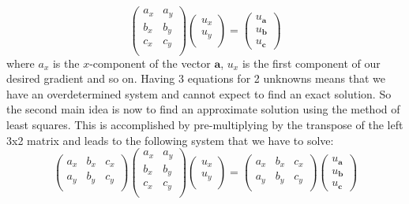 \begin{equation}
\begin{pmatrix}
  a_x & a_y  \\
  b_x & b_y  \\
  c_x & c_y  \\
\end{pmatrix}
\begin{pmatrix}
  u_x  \\
  u_y  \\
\end{pmatrix}
=
\begin{pmatrix}
  u_{\mathbf{a}}  \\
  u_{\mathbf{b}}  \\
  u_{\mathbf{c}}
\end{pmatrix}
\end{equation}
where $a_x$ is the $x$-component of the vector $\mathbf{a}$, $u_x$ is the first component of our desired gradient and so on. Having 3 equations for 2 unknowns means that we have an overdetermined system and cannot expect to find an exact solution. So the second main idea is now to find an approximate solution using the method of least squares. This is accomplished by pre-multiplying by the transpose of the left 3x2 matrix and leads to the following system that we have to solve:
\begin{equation}
\begin{pmatrix}
a_x & b_x & c_x  \\
a_y & b_y & c_y  \\
\end{pmatrix}
\begin{pmatrix}
a_x & a_y  \\
b_x & b_y  \\
c_x & c_y  \\
\end{pmatrix}
\begin{pmatrix}
u_x  \\
u_y  \\
\end{pmatrix}
=
\begin{pmatrix}
a_x & b_x & c_x  \\
a_y & b_y & c_y  \\
\end{pmatrix}
\begin{pmatrix}
u_{\mathbf{a}}  \\
u_{\mathbf{b}}  \\
u_{\mathbf{c}}
\end{pmatrix}
\end{equation}
